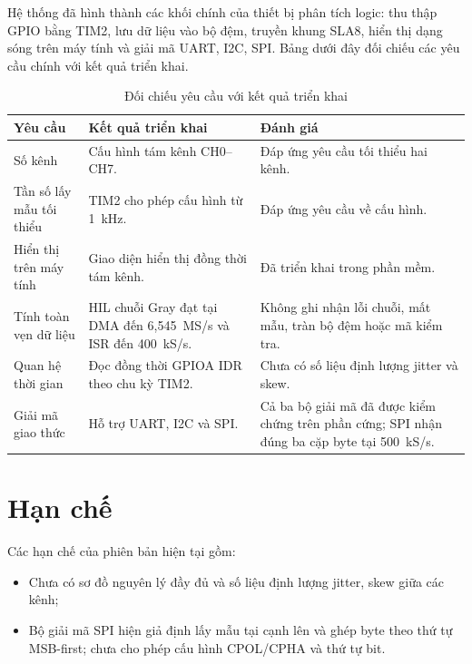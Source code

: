 Hệ thống đã hình thành các khối chính của thiết bị phân tích logic: thu thập GPIO bằng TIM2, lưu dữ liệu vào bộ đệm, truyền khung SLA8, hiển thị dạng sóng trên máy tính và giải mã UART, I2C, SPI. Bảng dưới đây đối chiếu các yêu cầu chính với kết quả triển khai.

\begin{longtable}[]{@{}|
  >{\raggedright\arraybackslash}p{}
  |>{\raggedright\arraybackslash}p{}
  |>{\raggedright\arraybackslash}p{}|@{}}
\caption{Đối chiếu yêu cầu với kết quả triển khai}\tabularnewline
\hline
\textbf{Yêu cầu} & \textbf{Kết quả triển khai} & \textbf{Đánh giá} \\ \hline

Số kênh & Cấu hình tám kênh CH0--CH7. & Đáp ứng yêu cầu tối thiểu hai kênh. \\ \hline
Tần số lấy mẫu tối thiểu & TIM2 cho phép cấu hình từ 1~kHz. & Đáp ứng yêu cầu về cấu hình. \\ \hline
Hiển thị trên máy tính & Giao diện hiển thị đồng thời tám kênh. & Đã triển khai trong phần mềm. \\ \hline
Tính toàn vẹn dữ liệu & HIL chuỗi Gray đạt tại DMA đến 6,545~MS/s và ISR đến 400~kS/s. & Không ghi nhận lỗi chuỗi, mất mẫu, tràn bộ đệm hoặc mã kiểm tra. \\ \hline
Quan hệ thời gian & Đọc đồng thời GPIOA IDR theo chu kỳ TIM2. & Chưa có số liệu định lượng jitter và skew. \\ \hline
Giải mã giao thức & Hỗ trợ UART, I2C và SPI. & Cả ba bộ giải mã đã được kiểm chứng trên phần cứng; SPI nhận đúng ba cặp byte tại 500~kS/s. \\ \hline

\end{longtable}

\section{Hạn chế}\label{hux1ea1n-chux1ebf}

Các hạn chế của phiên bản hiện tại gồm:
\begin{itemize}
\item Chưa có sơ đồ nguyên lý đầy đủ và số liệu định lượng jitter, skew giữa các kênh;
\item Bộ giải mã SPI hiện giả định lấy mẫu tại cạnh lên và ghép byte theo thứ tự MSB-first; chưa cho phép cấu hình CPOL/CPHA và thứ tự bit.
\end{itemize}

